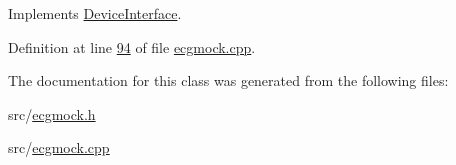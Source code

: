 Implements \hyperlink{classDeviceInterface_a101b3b53a01add866737920e03a850a8}{Device\+Interface}.



Definition at line \hyperlink{ecgmock_8cpp_source_l00094}{94} of file \hyperlink{ecgmock_8cpp_source}{ecgmock.\+cpp}.



The documentation for this class was generated from the following files\+:\begin{DoxyCompactItemize}
\item 
src/\hyperlink{ecgmock_8h}{ecgmock.\+h}\item 
src/\hyperlink{ecgmock_8cpp}{ecgmock.\+cpp}\end{DoxyCompactItemize}
